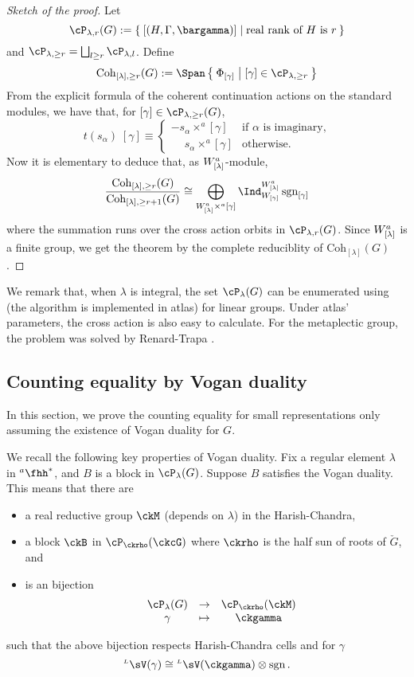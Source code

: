 \documentclass[12pt,a4paper]{amsart}
\newcommand{\sgn}{\operatorname{sgn}}
\numberwithin{equation}{section}
\theoremstyle{remark}
\def\ckG{\check{G}}
\def\hha{{}^a\fhh}
\def\LV{{}^{\scriptscriptstyle L}\sV}
\def\LV{{}^{\scriptscriptstyle L}\sV}
\newcommand{\crossa}{\times^a}
\def\Coh{\mathrm{Coh}}
\begin{document}
\begin{proof}[Sketch of the proof]
 Let
 \[
   \cP_{\lambda,r}(G):= \Set{[(H,\Gamma,\bargamma)]|
     \text{real rank of $H$ is $r$}}
 \]
 and $\cP_{\lambda,\geq r} = \bigsqcup_{l\geq r}\cP_{\lambda,l}$. Define
 \[
   \Coh_{[\lambda],\geq r}(G) :=
   \Span\Set{\Phi_{[\gamma]}|[\gamma]\in \cP_{\lambda,\geq r}}
 \]
 From the explicit formula of the coherent continuation actions on the standard
 modules, we have that, for $[\gamma]\in \cP_{\lambda,\geq r}(G)$,
 \[
   t(s_{\alpha})\; [\gamma]
   \equiv
   \begin{cases}
     - s_{\alpha}\crossa [\gamma] & \text{if $\alpha$ is imaginary,}\\
     \phantom{-} s_{\alpha}\crossa [\gamma] & \text{otherwise.}
   \end{cases}
 \]
 Now it is elementary to deduce that, as $W^a_{[\lambda]}$-module,
 \[
   \frac{\Coh_{[\lambda],\geq r}(G)}{\Coh_{[\lambda],\geq r+1}(G)}
   \cong \bigoplus_{\Wlama \crossa [\gamma]}
   \Ind_{W_{[\gamma]}}^{\Wlama} \sgn_{[\gamma]}
 \]
 where the summation runs over the cross action orbits
 in $\cP_{\lambda,r}(G)$.
 Since $W^a_{[\lambda]}$ is a finite group, we get the theorem by the complete
 reduciblity of $\Coh_{[\lambda]}(G)$.
\end{proof}

We remark that, when $\lambda$ is integral, the set $\cP_{\lambda}(G)$ can be enumerated using \cite{AC} (the
algorithm is implemented in atlas) for linear groups.
Under atlas' parameters, the cross action is also easy to calculate.
For the metaplectic group, the problem was solved by Renard-Trapa \cite{RT1,RT2}.




\subsection{Counting equality by Vogan duality}
In this section, we prove the counting equality for small representations
only assuming the existence of Vogan duality for $G$.

\def\dG{\ckM}
\def\CHC{\sC^{\mathrm{HC}}}

We recall the following key properties of Vogan duality. Fix a regular element
$\lambda$ in $\hha^{*}$, and $B$ is a block in $\cP_{\lambda}(G)$.
Suppose $B$ satisfies the Vogan duality. This means that
there are
\begin{itemize}
  \item
a real reductive group $\dG$ (depends on $\lambda$) in the Harish-Chandra,

\item a block $\ckB$ in $\cP_{\ckrho}(\ckcG)$ where $\ckrho$ is the half sun of
roots of $\ckG$, and
\item
is an bijection %
  \[
    \begin{array}{rccc}
     &\cP_{\lambda}(G)&\rightarrow& \cP_{\ckrho}(\dG)\\
      &\gamma & \mapsto& \ckgamma
    \end{array}
  \]
\end{itemize}
such that the above bijection respects Harish-Chandra cells and for $\gamma$
\[
  \LV(\gamma) \cong \LV(\ckgamma)\otimes \sgn.
\]
\end{document}

